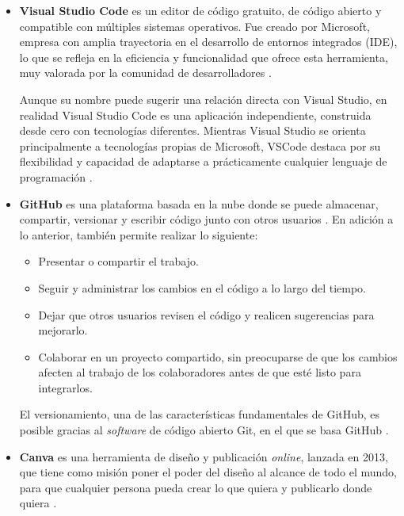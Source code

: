 \begin{itemize}	
	
	\item\textbf{Visual Studio Code} es un editor de código gratuito, de código abierto y compatible con múltiples sistemas operativos. Fue creado por Microsoft, empresa con amplia trayectoria en el desarrollo de entornos integrados (IDE), lo que se refleja en la eficiencia y funcionalidad que ofrece esta herramienta, muy valorada por la comunidad de desarrolladores \cite{cimas2024vscode}.
	
	Aunque su nombre puede sugerir una relación directa con Visual Studio, en realidad Visual Studio Code es una aplicación independiente, construida desde cero con tecnologías diferentes. Mientras Visual Studio se orienta principalmente a tecnologías propias de Microsoft, VSCode destaca por su flexibilidad y capacidad de adaptarse a prácticamente cualquier lenguaje de programación \cite{garcia2024vscode}.
	
	\item\textbf{GitHub} es una plataforma basada en la nube donde se puede almacenar, compartir, versionar y escribir código junto con otros usuarios \cite{github2025about}. En adición a lo anterior, también permite realizar lo siguiente:
	
	\begin{itemize}
		\item Presentar o compartir el trabajo.
		\item Seguir y administrar los cambios en el código a lo largo del tiempo.
		\item Dejar que otros usuarios revisen el código y realicen sugerencias para mejorarlo.
		\item Colaborar en un proyecto compartido, sin preocuparse de que los cambios afecten al trabajo de los colaboradores antes de que esté listo para integrarlos.
	\end{itemize}
	
	El versionamiento, una de las características fundamentales de GitHub, es posible gracias al \textit{software} de código abierto Git, en el que se basa GitHub \cite{github2025about}.
	
	\item\textbf{Canva} es una herramienta de diseño y publicación \textit{online}, lanzada en 2013, que tiene como misión poner el poder del diseño al alcance de todo el mundo, para que cualquier persona pueda crear lo que quiera y publicarlo donde quiera \cite{canva2025about}.
	

\end{itemize}
